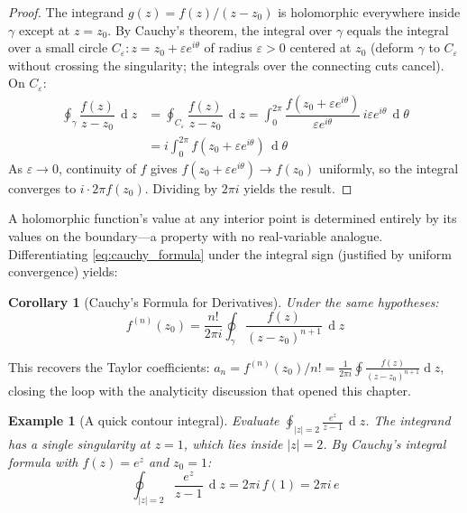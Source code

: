 \documentclass[12pt,a4paper]{report}
\DeclareMathOperator{\deriv}{d}
\theoremstyle{thms}
\newtheorem{corollary}{Corollary}[theorem]
\theoremstyle{defns}
\newtheorem{example}{Example}[section]
\begin{document}
\begin{proof}
    The integrand $g(z) = f(z)/(z - z_0)$ is holomorphic everywhere inside $\gamma$ except at $z = z_0$. By Cauchy's theorem, the integral over $\gamma$ equals the integral over a small circle $C_\varepsilon: z = z_0 + \varepsilon e^{i\theta}$ of radius $\varepsilon > 0$ centered at $z_0$ (deform $\gamma$ to $C_\varepsilon$ without crossing the singularity; the integrals over the connecting cuts cancel). On $C_\varepsilon$:
    \begin{align}
        \oint_\gamma \dfrac{f(z)}{z - z_0}\,\deriv{z} &= \oint_{C_\varepsilon} \dfrac{f(z)}{z - z_0}\,\deriv{z} = \int_0^{2\pi} \dfrac{f(z_0 + \varepsilon e^{i\theta})}{\varepsilon e^{i\theta}}\,i\varepsilon e^{i\theta}\,\deriv{\theta} \\
        &= i\int_0^{2\pi} f(z_0 + \varepsilon e^{i\theta})\,\deriv{\theta}
    \end{align}
    As $\varepsilon \to 0$, continuity of $f$ gives $f(z_0 + \varepsilon e^{i\theta}) \to f(z_0)$ uniformly, so the integral converges to $i \cdot 2\pi f(z_0)$. Dividing by $2\pi i$ yields the result.
\end{proof}

A holomorphic function's value at any interior point is determined entirely by its values on the boundary—a property with no real-variable analogue. Differentiating \eqref{eq:cauchy_formula} under the integral sign (justified by uniform convergence) yields:

\begin{corollary}[Cauchy's Formula for Derivatives]
    Under the same hypotheses:
    \begin{equation}
        f^{(n)}(z_0) = \dfrac{n!}{2\pi i}\oint_\gamma \dfrac{f(z)}{(z - z_0)^{n+1}}\,\deriv{z}
        \label{eq:cauchy_deriv}
    \end{equation}
\end{corollary}

This recovers the Taylor coefficients: $a_n = f^{(n)}(z_0)/n! = \frac{1}{2\pi i}\oint \frac{f(z)}{(z-z_0)^{n+1}}\deriv{z}$, closing the loop with the analyticity discussion that opened this chapter.

\begin{example}[A quick contour integral]
    Evaluate $\oint_{|z|=2} \frac{e^z}{z - 1}\,\deriv{z}$. The integrand has a single singularity at $z = 1$, which lies inside $|z| = 2$. By Cauchy's integral formula with $f(z) = e^z$ and $z_0 = 1$:
    \begin{equation}
        \oint_{|z|=2} \dfrac{e^z}{z - 1}\,\deriv{z} = 2\pi i\,f(1) = 2\pi i\,e
    \end{equation}
\end{example}
\end{document}

